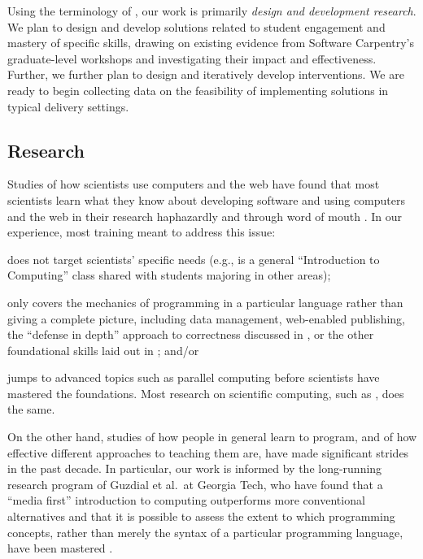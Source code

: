 \documentclass{proposalnsf}
\begin{document}
Using the terminology of \cite{guidelines}, our work is primarily
\emph{design and development research}. We plan to design and develop
solutions related to student engagement and mastery of specific
skills, drawing on existing evidence from Software Carpentry's
graduate-level workshops and investigating their impact and
effectiveness. Further, we further plan to design and iteratively
develop interventions. We are ready to begin collecting data on the
feasibility of implementing solutions in typical delivery settings.

\subsection{Research}

Studies of how scientists use computers and the web have found that
most scientists learn what they know about developing software and
using computers and the web in their research haphazardly and through
word of mouth \cite{hannay2009,prabhu2011}. In our experience, most
training meant to address this issue:

\begin{compactitem}

\item
  does not target scientists' specific needs (e.g., is a general
  ``Introduction to Computing'' class shared with students majoring in
  other areas);

\item
  only covers the mechanics of programming in a particular language
  rather than giving a complete picture, including data management,
  web-enabled publishing, the ``defense in depth'' approach to
  correctness discussed in \cite{dubois2005}, or the other
  foundational skills laid out in \cite{wilson2013}; and/or

\item
  jumps to advanced topics such as parallel computing before
  scientists have mastered the foundations.  Most research on
  scientific computing, such as \cite{hochstein2005}, does the same.

\end{compactitem}

On the other hand, studies of how people in general learn to program,
and of how effective different approaches to teaching them are, have
made significant strides in the past decade.  In particular, our work
is informed by the long-running research program of Guzdial et al.\ at
Georgia Tech, who have found that a ``media first'' introduction to
computing outperforms more conventional alternatives
\cite{guzdial2013} and that it is possible to assess the extent to
which programming concepts, rather than merely the syntax of a
particular programming language, have been mastered \cite{tew2011}.
\end{document}
